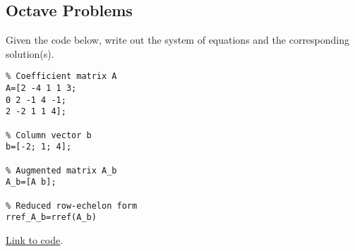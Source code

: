 \documentclass{ximera}
\begin{document}
\subsection*{Octave Problems}

\begin{problem}\label{prob_oct_0}
    Given the code below, write out the system of equations and the corresponding solution(s).

    \begin{verbatim}
% Coefficient matrix A
A=[2 -4 1 1 3;
0 2 -1 4 -1;
2 -2 1 1 4];

% Column vector b
b=[-2; 1; 4];

% Augmented matrix A_b
A_b=[A b];

% Reduced row-echelon form
rref_A_b=rref(A_b)
    \end{verbatim}

\href{https://sagecell.sagemath.org/?z=eJxFjcEKwjAQRO-B_MNcCnoI2NpbySH4B16LFJtuNNA0sKTq57sVVBaGGeaxU-GUKYToIy0F6Vo4vuC0crZvYFrUcsdOqwMk1mhFJIlvPlV7kaRVJV_mNS14kC-ZMWo12t40Heruz7j1lmSFpt_OIKCI7R3GL3WmafXCcH4a8nea84KQOWnFTGHY8M3sxOzf0oYzHQ==&lang=octave&interacts=eJyLjgUAARUAuQ==}{Link to code}.    
\end{problem}
\end{document}
